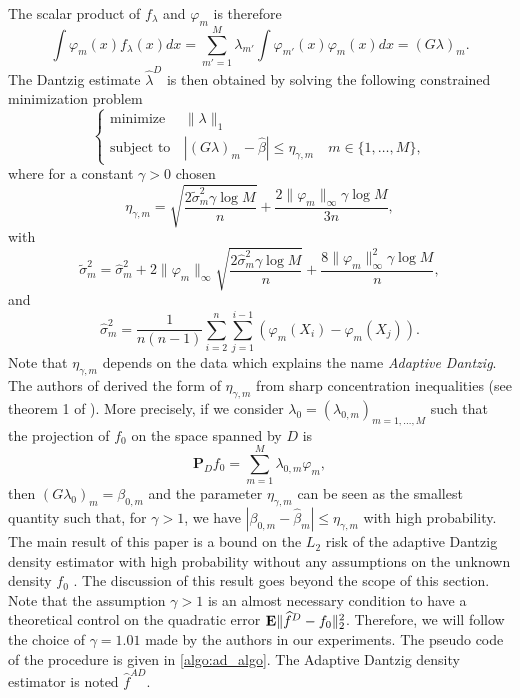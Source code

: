The scalar product of $f_{\lambda}$ and $\varphi_m$ is therefore
\begin{equation}
    \int\varphi_m(x)f_{\lambda}(x)dx = \sum_{m'=1}^M\lambda_{m'}\int\varphi_{m'}(x)\varphi_m(x)dx = (G\lambda)_m.
\end{equation}
The Dantzig estimate $\hat\lambda^D$ is then obtained by solving the following constrained minimization problem
\begin{equation*}
    \left\{
    \begin{array}{ll}
        \text{minimize}\, &\|\lambda\|_1 \\
        \text{subject to}\, &|(G\lambda)_m-\hat\beta|\leq \eta_{\gamma,m} \quad m\in \{1,\dots,M\},
    \end{array} \right.
\end{equation*}
where for a constant $\gamma > 0$ chosen 
\begin{equation}
    \eta_{\gamma,m} = \sqrt{\frac{2\tilde\sigma_m^2\gamma\log{M}}{n}}+ \frac{2\|\varphi_m\|_{\infty}\gamma\log{M}}{3n},
\end{equation}
with
\begin{equation}
    \tilde\sigma_m^2 = \hat\sigma_m^2+2\|\varphi_m \|_{\infty}\sqrt{\frac{2\hat\sigma_m^2\gamma\log{M}}{n}}+ \frac{8\|\varphi_m\|_{\infty}^2\gamma\log{M}}{n},
\end{equation}
and
\begin{equation}
    \hat\sigma^2_m = \frac{1}{n(n-1)}\sum_{i=2}^n\sum_{j=1}^{i-1}(\varphi_m(X_i)-\varphi_m(X_j)).
\end{equation}
Note that $\eta_{\gamma,m}$ depends on the data which explains the name \textit{Adaptive Dantzig}. The authors of \cite{Bertin} derived the form of $\eta_{\gamma,m}$ from sharp concentration inequalities (see theorem 1 of \cite{Bertin}). More precisely, if we consider $\lambda_0=(\lambda_{0,m})_{m=1,\dots,M}$ such that the projection of $f_0$ on the space spanned by $D$ is
\begin{equation}
    \textbf{P}_{D}f_0=\sum_{m=1}^M\lambda_{0,m}\varphi_m,
\end{equation}
then $(G\lambda_0)_m=\beta_{0,m}$  and the parameter $\eta_{\gamma,m}$ can be seen as the smallest quantity such that, for $\gamma > 1$, we have $|\beta_{0,m}-\hat\beta_m|\leq \eta_{\gamma,m}$ with high probability. The main result of this paper is a bound on the $L_2$ risk of the adaptive Dantzig density estimator with high probability without any assumptions on the unknown density $f_0$ . The discussion of this result goes beyond the scope of this section. Note that the assumption $\gamma > 1$ is an almost necessary condition to have a theoretical control on the quadratic error $\mathbf E\|\widehat f^D-f_0 \|^2_2$. Therefore, we will follow the choice of $\gamma=1.01$ made by the authors in our experiments. The pseudo code of the procedure is given in \cref{algo:ad_algo}. The Adaptive Dantzig density estimator is noted $\hat f ^{AD}$.

